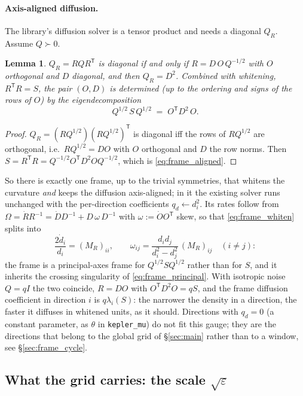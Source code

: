 \documentclass[11pt,a4paper]{article}
\newcommand{\T}{^{\mathsf T}}
\newcommand{\eps}{\varepsilon}
\theoremstyle{plain}
\newtheorem{lemma}{Lemma}
\theoremstyle{definition}
\theoremstyle{remark}
\begin{document}
\paragraph{Axis-aligned diffusion.}
The library's diffusion solver is a tensor product and needs a diagonal $Q_R$. Assume $Q\succ0$.
\begin{lemma}
$Q_R = RQR\T$ is diagonal if and only if $R = D\,O\,Q^{-1/2}$ with $O$ orthogonal and $D$ diagonal, and then $Q_R = D^2$. Combined with whitening, $R\T R = S$, the pair $(O,D)$ is determined (up to the ordering and signs of the rows of $O$) by the eigendecomposition
\begin{equation}
  Q^{1/2}\,S\,Q^{1/2} \;=\; O\T D^2\,O .
  \label{eq:frame_aligned}
\end{equation}
\end{lemma}
\begin{proof}
$Q_R = (RQ^{1/2})(RQ^{1/2})\T$ is diagonal iff the rows of $RQ^{1/2}$ are orthogonal, i.e.\ $RQ^{1/2} = DO$ with $O$ orthogonal and $D$ the row norms. Then $S = R\T R = Q^{-1/2}O\T D^2OQ^{-1/2}$, which is \eqref{eq:frame_aligned}.
\end{proof}
So there is exactly one frame, up to the trivial symmetries, that whitens the curvature \emph{and} keeps the diffusion axis-aligned; in it the existing solver runs unchanged with the per-direction coefficients $q_d\leftarrow d_i^2$. Its rates follow from $\Omega = \dot RR^{-1} = \dot DD^{-1} + D\,\omega\,D^{-1}$ with $\omega:=\dot OO\T$ skew, so that \eqref{eq:frame_whiten} splits into
\[
  \frac{2\dot d_i}{d_i} = (M_R)_{ii}, \qquad \omega_{ij} = \frac{d_id_j}{d_i^2-d_j^2}\,(M_R)_{ij}\quad(i\ne j):
\]
the frame is a principal-axes frame for $Q^{1/2}SQ^{1/2}$ rather than for $S$, and it inherits the crossing singularity of \eqref{eq:frame_principal}. With isotropic noise $Q=qI$ the two coincide, $R = DO$ with $O\T D^2O = qS$, and the frame diffusion coefficient in direction $i$ is $q\lambda_i(S)$: the narrower the density in a direction, the faster it diffuses in whitened units, as it should. Directions with $q_d=0$ (a constant parameter, as $\theta$ in \texttt{kepler\_mu}) do not fit this gauge; they are the directions that belong to the global grid of \S\ref{sec:main} rather than to a window, see \S\ref{sec:frame_cycle}.

\subsection{What the grid carries: the scale \texorpdfstring{$\sqrt\eps$}{sqrt(eps)}}
\label{sec:frame_scale}
\end{document}
